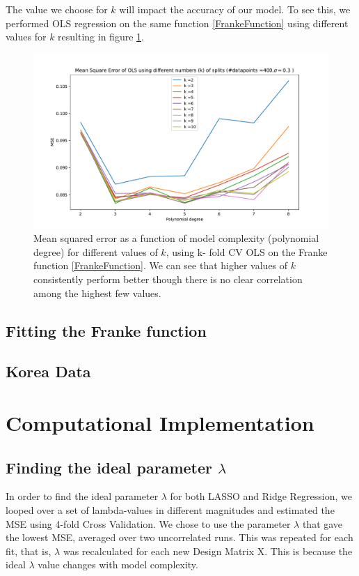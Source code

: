 \documentclass[11pt,a4paper,titlepage]{article}
\begin{document}
The value we choose for $k$ will impact the accuracy of our model. To see this, we performed OLS regression on the same function \eqref{FrankeFunction} using different values for $k$ resulting in figure \ref{bestKOLS}.
\begin{figure}[H]
\centering

\includegraphics[trim=1.4cm 0.2cm 2.5cm 1.2cm, clip=true,scale = 0.6]{MSE_OLS_k_comparison_2to10.pdf}
\caption[MSE from OLS using different number of splits in k-fold CV]{Mean squared error as a function of model complexity (polynomial degree) for different values of $k$, using k- fold CV OLS on the Franke function \eqref{FrankeFunction}. We can see that higher values of $k$ consistently perform better though there is no clear correlation among the highest few values.}\label{bestKOLS}
\end{figure}

\subsection{Fitting the Franke function}
\subsection{Korea Data}
\section{Computational Implementation}
\subsection{Finding the ideal parameter $\lambda$}
In order to find the ideal parameter $\lambda$ for both LASSO and Ridge Regression, we looped over a set of lambda-values in different magnitudes and estimated the MSE using 4-fold Cross Validation. We chose to use the parameter $\lambda$ that gave the lowest MSE, averaged over two uncorrelated runs. This was repeated for each fit, that is,  $\lambda$ was recalculated for each new Design Matrix X. This is because the ideal $\lambda$ value changes with model complexity.
\end{document}
